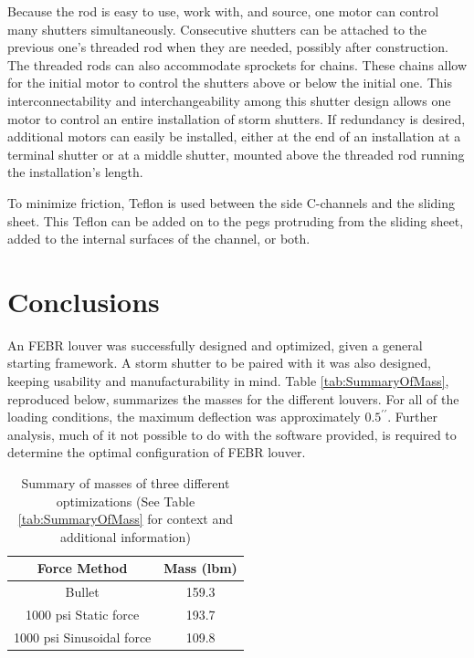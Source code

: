 \documentclass[12pt,letterpaper]{report}
\newcommand{\inchsign}{^{\prime\prime}} %
\begin{document}
		Because the rod is easy to use, work with, and source, one motor can control many shutters simultaneously.  Consecutive shutters can be attached to the previous one's threaded rod when they are needed, possibly after construction.  The threaded rods can also accommodate sprockets for chains.  These chains allow for the initial motor to control the shutters above or below the initial one.  This interconnectability and interchangeability among this shutter design allows one motor to control an entire installation of storm shutters.  If redundancy is desired, additional motors can easily be installed, either at the end of an installation at a terminal shutter or at a middle shutter, mounted above the threaded rod running the installation's length.
		
		To minimize friction, Teflon is used between the side C-channels and the sliding sheet.  This Teflon can be added on to the pegs protruding from the sliding sheet, added to the internal surfaces of the channel, or both.
		
		\graphicspath{ {..} }
		\chapter{Conclusions}
		\vspace{-.25in}
		
		An FEBR louver was successfully designed and optimized, given a general starting framework.  A storm shutter to be paired with it was also designed, keeping usability and manufacturability in mind.  Table \ref{tab:SummaryOfMass}, reproduced below, summarizes the masses for the different louvers.  For all of the loading conditions, the maximum deflection was approximately $0.5\inchsign$.  Further analysis, much of it not possible to do with the software provided, is required to determine the optimal configuration of FEBR louver.
		
		\begin{table}[b]
			\centering
			\begin{tabular}{|c|c|}
			\hline \textbf{Force Method} & \textbf{Mass (lbm)}\\
			\hline Bullet & 159.3\\
			\hline 1000 psi Static force & 193.7\\
			\hline 1000 psi Sinusoidal force & 109.8\\
			\hline
			\end{tabular}
			\caption[Summary of masses of three different optimizations]{Summary of masses of three different optimizations (See Table \ref{tab:SummaryOfMass} for context and additional information)}
			\label{tab:SummaryOfMassAgain}
		\end{table}
		
\end{document}
